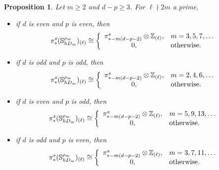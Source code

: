 \documentclass[a4paper, oneside]{amsart}
\newcommand{\1}{\mathds{1}}
\newtheorem{prop}[thm]{Proposition}
\theoremstyle{remark}
\theoremstyle{definition}
\newcommand{\Z}{{\scaleobj{0.97}{\mathbb{Z}}}}
\newcommand{\s}{\mathbb{S}}
\numberwithin{equation}{section}
\begin{document}
\begin{prop}\label{htpygroupsEmcoprimeprop}
    Let $m\geq 2$ and $d-p\geq 3$. For $\ell\nmid 2m$ a prime,
    \begin{itemize}
    \item if $d$ is even and $p$ is even, then
    $$
\pi_*^s(\s^{\rho_m}_{hD_m})_{(\ell)}\cong\left\{
\begin{array}{cl}
    \pi_{*-m(d-p-2)}^s\otimes \Z_{(\ell)}, & m=3,5,7,\dots\\
    0, & \text{otherwise}.
\end{array}
\right.
    $$

    \item if $d$ is odd and $p$ is odd, then
    $$
\pi_*^s(\s^{\rho_m}_{hD_m})_{(\ell)}\cong\left\{
\begin{array}{cl}
    \pi_{*-m(d-p-2)}^s\otimes \Z_{(\ell)}, & m=2,4,6,\dots\\
    0, & \text{otherwise}.
\end{array}
\right.
    $$

    \item if $d$ is even and $p$ is odd, then
    $$
\pi_*^s(\s^{\rho_m}_{hD_m})_{(\ell)}\cong\left\{
\begin{array}{cl}
    \pi_{*-m(d-p-2)}^s\otimes \Z_{(\ell)}, & m=5,9,13,\dots\\
    0, & \text{otherwise}.
\end{array}
\right.
$$ 

    \item if $d$ is odd and $p$ is even, then
    $$
\pi_*^s(\s^{\rho_m}_{hD_m})_{(\ell)}\cong\left\{
\begin{array}{cl}
    \pi_{*-m(d-p-2)}^s\otimes \Z_{(\ell)}, & m=3,7,11,\dots\\
    0, & \text{otherwise}.
\end{array}
\right.
    $$
\end{itemize}
\end{prop}
\end{document}
